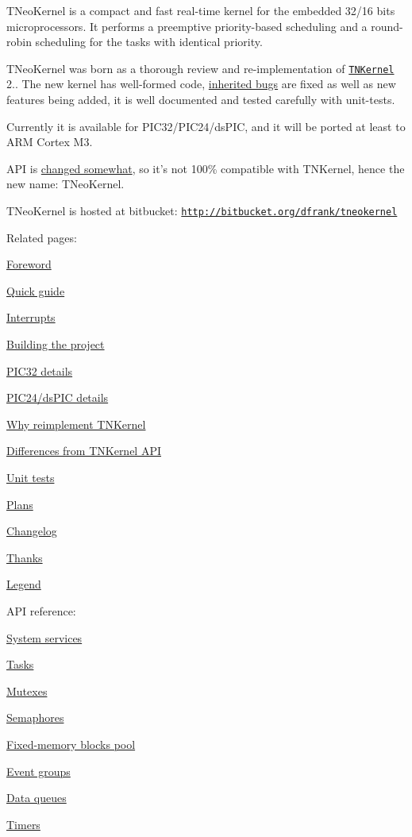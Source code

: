 T\+Neo\+Kernel is a compact and fast real-\/time kernel for the embedded 32/16 bits microprocessors. It performs a preemptive priority-\/based scheduling and a round-\/robin scheduling for the tasks with identical priority.

T\+Neo\+Kernel was born as a thorough review and re-\/implementation of \href{http://tnkernel.com}{\tt T\+N\+Kernel} 2.. The new kernel has well-\/formed code, \hyperlink{why_reimplement_why_reimplement__bugs}{inherited bugs} are fixed as well as new features being added, it is well documented and tested carefully with unit-\/tests.

Currently it is available for P\+I\+C32/\+P\+I\+C24/ds\+P\+I\+C, and it will be ported at least to A\+R\+M Cortex M3.

A\+P\+I is \hyperlink{tnkernel_diff}{changed somewhat}, so it's not 100\% compatible with T\+N\+Kernel, hence the new name\+: T\+Neo\+Kernel.

T\+Neo\+Kernel is hosted at bitbucket\+: \href{http://bitbucket.org/dfrank/tneokernel}{\tt http\+://bitbucket.\+org/dfrank/tneokernel}

Related pages\+:


\begin{DoxyItemize}
\item \hyperlink{foreword}{Foreword}
\item \hyperlink{quick_guide}{Quick guide}
\item \hyperlink{interrupts}{Interrupts}
\item \hyperlink{building}{Building the project}
\item \hyperlink{pic32_details}{P\+I\+C32 details}
\item \hyperlink{pic24_details}{P\+I\+C24/ds\+P\+I\+C details}
\item \hyperlink{why_reimplement}{Why reimplement T\+N\+Kernel}
\item \hyperlink{tnkernel_diff}{Differences from T\+N\+Kernel A\+P\+I}
\item \hyperlink{unit_tests}{Unit tests}
\item \hyperlink{plans}{Plans}
\item \hyperlink{changelog}{Changelog}
\item \hyperlink{thanks}{Thanks}
\item \hyperlink{legend}{Legend}
\end{DoxyItemize}

A\+P\+I reference\+:


\begin{DoxyItemize}
\item \hyperlink{tn__sys_8h}{System services}
\item \hyperlink{tn__tasks_8h}{Tasks}
\item \hyperlink{tn__mutex_8h}{Mutexes}
\item \hyperlink{tn__sem_8h}{Semaphores}
\item \hyperlink{tn__fmem_8h}{Fixed-\/memory blocks pool}
\item \hyperlink{tn__eventgrp_8h}{Event groups}
\item \hyperlink{tn__dqueue_8h}{Data queues}
\item \hyperlink{tn__timer_8h}{Timers} 
\end{DoxyItemize}